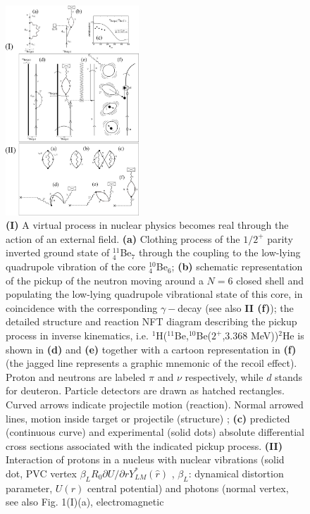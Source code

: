   \begin{figure}
  \centerline{\includegraphics*[width=5cm,angle=0]{C8/figsC8/Fig3}}
  	\caption{\textbf{{(I)}} A virtual process in nuclear physics becomes real through the action of an external field. 
  	{\bf (a)}  Clothing process of the $1/2^+$ parity inverted ground state of $^{11}_4$Be$_{7}$
  	through the coupling to the low-lying quadrupole vibration of the core $^{10}_4$Be$_6$; 
  	{\bf (b)} schematic representation 
  	of the pickup of the neutron moving around a $N=6$ closed shell and populating the low-lying
  	quadrupole vibrational state of this core, in coincidence with the corresponding $\gamma-$decay 
  	(see also {\bf II (f)}); the detailed structure and reaction NFT diagram describing the pickup
  	process in inverse kinematics, i.e. $^1$H($^{11}$Be,$^{10}$Be($2^+$,3.368 MeV))$^2$He is 
  	shown in {\bf (d)} and  {\bf (e)} together with a cartoon representation in {\bf (f)} (the jagged line represents 
  	a graphic mnemonic of the recoil effect).
  	Proton 
  	and neutrons are labeled $\pi$ and $\nu$ respectively, while $d$ stands for deuteron. Particle detectors are drawn as hatched rectangles.
  	Curved arrows indicate projectile motion (reaction). Normal arrowed 
  	lines, motion inside target or projectile (structure)
  	; {\bf (c)} predicted (continuous curve) and experimental
  	(solid dots) absolute differential cross sections     associated with the indicated  pickup process. 
  	{\bf (II)} Interaction of protons in a nucleus with nuclear vibrations (solid dot, PVC vertex 
  	$\beta_L R_0  \partial U/\partial r Y_{LM}^*(\hat r)$ \cite{Bohr}, $\beta_L$: dynamical
  	distortion parameter, $U(r)$ central potential) and photons (normal vertex, see also Fig. 1(I)(a), 
  	electromagnetic 
}
\end{figure}
